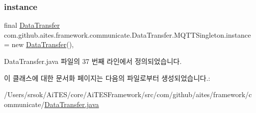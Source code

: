 \subsubsection{\texorpdfstring{instance}{instance}}
{\footnotesize\ttfamily final \mbox{\hyperlink{classcom_1_1github_1_1aites_1_1framework_1_1communicate_1_1_data_transfer}{Data\+Transfer}} com.\+github.\+aites.\+framework.\+communicate.\+Data\+Transfer.\+M\+Q\+T\+T\+Singleton.\+instance = new \mbox{\hyperlink{classcom_1_1github_1_1aites_1_1framework_1_1communicate_1_1_data_transfer}{Data\+Transfer}}()\hspace{0.3cm}{\ttfamily [static]}, {\ttfamily [private]}}



Data\+Transfer.\+java 파일의 37 번째 라인에서 정의되었습니다.



이 클래스에 대한 문서화 페이지는 다음의 파일로부터 생성되었습니다.\+:\begin{DoxyCompactItemize}
\item 
/\+Users/srsok/\+Ai\+T\+E\+S/core/\+Ai\+T\+E\+S\+Framework/src/com/github/aites/framework/communicate/\mbox{\hyperlink{_data_transfer_8java}{Data\+Transfer.\+java}}\end{DoxyCompactItemize}
